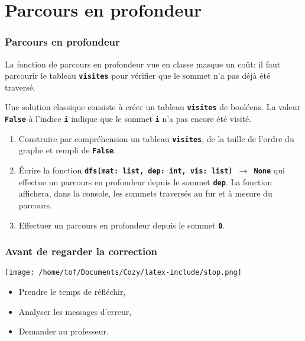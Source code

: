 \documentclass[svgnames,11pt]{beamer}
\begin{document}
\section{Parcours en profondeur}
\begin{frame}
    \frametitle{Parcours en profondeur}

    La fonction de parcours en profondeur vue en classe masque un coût: il faut parcourir le tableau \textbf{\texttt{visites}} pour vérifier que le sommet n'a pas déjà été traversé.
    \begin{aretenir}[]
    Une solution classique consiste à créer un tableau \textbf{\texttt{visites}} de booléens. La valeur \textbf{\texttt{False}} à l'indice \textbf{\texttt{i}} indique que le sommet \textbf{\texttt{i}} n'a pas encore été visité.
    
    \end{aretenir}

\end{frame}
\begin{frame}

\begin{activite}
\begin{enumerate}
    \item Construire par compréhension un tableau \textbf{\texttt{visites}}, de la taille  de l'ordre du graphe et rempli de \textbf{\texttt{False}}.
    \item Écrire la fonction \textbf{\texttt{dfs(mat: list, dep: int, vis: list) $\rightarrow$ None}} qui effectue un parcours en profondeur depuis le sommet \textbf{\texttt{dep}}. La fonction affichera, dans la console, les sommets traversés au fur et à mesure du parcours.
    \item Effectuer un parcours en profondeur depuis le sommet \textbf{\texttt{0}}.
\end{enumerate}
\end{activite}

\end{frame}
\begin{frame}
    \frametitle{Avant de regarder la correction}
\begin{center}
    \centering
    \texttt{[image: /home/tof/Documents/Cozy/latex-include/stop.png]}
    \end{center}
{\Large
    \begin{itemize}
        \item Prendre le temps de réfléchir,
        \item Analyser les messages d'erreur,
        \item Demander au professeur.
    \end{itemize}
}
\end{frame}
\end{document}
